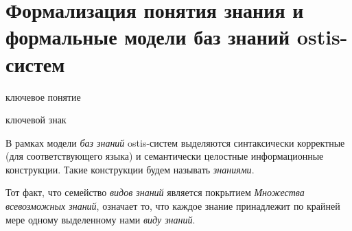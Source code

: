 \section{Формализация понятия знания и формальные модели баз знаний ostis-систем}
\label{sec_kb}

\begin{SCn}
	\begin{scnrelfromlist}{ключевое понятие}
	\end{scnrelfromlist}
\end{SCn}

\begin{SCn}
	\begin{scnrelfromlist}{ключевой знак}
	\end{scnrelfromlist}
\end{SCn}


В рамках модели \textit{баз знаний} ostis-систем выделяются синтаксически корректные (для соответствующего языка) и семантически целостные информационные конструкции. Такие конструкции будем называть \textit{знаниями}.

\begin{SCn}
	\begin{scnindent}
	\end{scnindent}
\end{SCn}

Тот факт, что семейство \textit{видов знаний} является покрытием \textit{Множества всевозможных знаний}, означает то, что каждое знание принадлежит по крайней мере одному выделенному нами \textit{виду знаний}.

